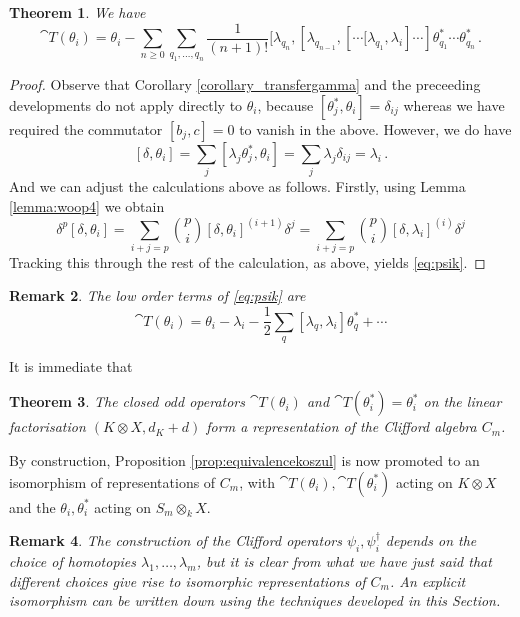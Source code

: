 \documentclass[english,letter paper,12pt,leqno]{article}
\newtheorem{theorem}{Theorem}[section]
\theoremstyle{example}
\newtheorem{remark}[theorem]{Remark}
\numberwithin{equation}{section}
\def\be{\begin{equation}}
\def\ee{\end{equation}}
\begin{document}
\begin{theorem}\label{theorem:psik} We have
\begin{equation}\label{eq:psik}
\cat{T}(\theta_i) = \theta_i - \sum_{n \ge 0} \sum_{q_1,\ldots,q_n} \frac{1}{(n+1)!} [ \lambda_{q_n}, [ \lambda_{q_{n-1}}, [ \cdots \big[ \lambda_{q_1}, \lambda_i ] \cdots ] \theta_{q_1}^* \cdots \theta_{q_n}^*\,.
\end{equation}
\end{theorem}
\begin{proof}
Observe that Corollary \ref{corollary_transfergamma} and the preceeding developments do not apply directly to $\theta_i$, because $[ \theta_j^*, \theta_i ] = \delta_{ij}$ whereas we have required the commutator $[b_j,c] = 0$ to vanish in the above. However, we do have
\[
[ \delta, \theta_i ] = \sum_j [ \lambda_j \theta_j^*, \theta_i ] = \sum_j \lambda_j \delta_{ij} = \lambda_i\,.
\]
And we can adjust the calculations above as follows. Firstly, using Lemma \ref{lemma:woop4} we obtain
\[
\delta^p [\delta, \theta_i] = \sum_{i+j=p} \binom{p}{i} [\delta, \theta_i]^{(i+1)} \delta^j = \sum_{i+j=p} \binom{p}{i} [\delta, \lambda_i]^{(i)} \delta^j
\]
Tracking this through the rest of the calculation, as above, yields \eqref{eq:psik}.
\end{proof}

\begin{remark} The low order terms of \eqref{eq:psik} are
\be
\cat{T}(\theta_i) = \theta_i - \lambda_i - \frac{1}{2} \sum_q [\lambda_q, \lambda_i] \theta^*_q + \cdots
\ee
\end{remark}

It is immediate that

\begin{theorem} The closed odd operators $\cat{T}(\theta_i)$ and $\cat{T}(\theta_i^*) = \theta_i^*$ on the linear factorisation $(K \otimes X, d_K + d)$ form a representation of the Clifford algebra $C_m$.
\end{theorem}

By construction, Proposition \ref{prop:equivalencekoszul} is now promoted to an isomorphism of representations of $C_m$, with $\cat{T}(\theta_i), \cat{T}(\theta_i^*)$ acting on $K \otimes X$ and the $\theta_i, \theta_i^*$ acting on $S_m \otimes_k X$. 

\begin{remark} The construction of the Clifford operators $\psi_i, \psi_i^\dagger$ depends on the choice of homotopies $\lambda_1,\ldots,\lambda_m$, but it is clear from what we have just said that different choices give rise to isomorphic representations of $C_m$. An explicit isomorphism can be written down using the techniques developed in this Section.
\end{remark}
\end{document}
